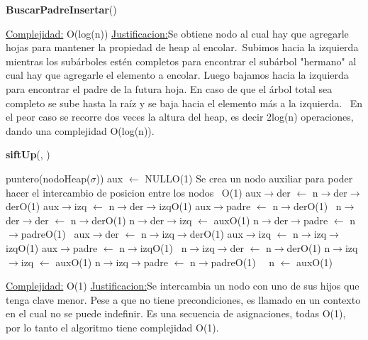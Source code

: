 \begin{Representacion}
\begin{Algoritmos}
\begin{algorithm}[H]{\textbf{BuscarPadreInsertar}()}
\begin{algorithmic}[1]
		\medskip
		\Statex \underline{Complejidad:} O(log(n))
			\Statex \underline{Justificacion:}Se obtiene nodo al cual hay que agregarle hojas para mantener la propiedad de heap al encolar.\,
			     Subimos hacia la izquierda mientras los subárboles estén completos para encontrar el subárbol "hermano" al cual hay que agregarle el elemento a encolar. Luego bajamos hacia la izquierda para encontrar el padre de la futura hoja. En caso de que el árbol total sea completo se sube hasta la raíz y se baja hacia el elemento más a la izquierda.
			\,   En el peor caso se recorre dos veces la altura del heap, es decir 2log(n) operaciones, dando una complejidad O(log(n)). 
	\end{algorithmic}
\end{algorithm}


\begin{algorithm}[H]{\textbf{siftUp}(, )}
	\begin{algorithmic}[1]
		
		\State puntero(nodoHeap($\sigma$)) aux $\leftarrow$ NULL\Comment O(1)
		\Comment Se crea un nodo auxiliar para poder hacer el intercambio de posicion entre los nodos
		\,
		\Comment O(1)
			\State aux$\rightarrow$der $\leftarrow$ n$\rightarrow$der$\rightarrow$der\Comment O(1)
			\State aux$\rightarrow$izq $\leftarrow$ n$\rightarrow$der$\rightarrow$izq\Comment O(1)
			\State aux$\rightarrow$padre $\leftarrow$ n$\rightarrow$der\Comment O(1)
			\,
			\State n$\rightarrow$der$\rightarrow$der $\leftarrow$ n$\rightarrow$der\Comment O(1)
			\State n$\rightarrow$der$\rightarrow$izq $\leftarrow$ aux\Comment O(1)
			\State n$\rightarrow$der$\rightarrow$padre $\leftarrow$ n$\rightarrow$padre\Comment O(1)
			\,
		\Else
			\State aux$\rightarrow$der $\leftarrow$ n$\rightarrow$izq$\rightarrow$der\Comment O(1)
			\State aux$\rightarrow$izq $\leftarrow$ n$\rightarrow$izq$\rightarrow$izq\Comment O(1)
			\State aux$\rightarrow$padre $\leftarrow$ n$\rightarrow$izq\Comment O(1)
			\,
			\State n$\rightarrow$izq$\rightarrow$der $\leftarrow$ n$\rightarrow$der\Comment O(1)
			\State n$\rightarrow$izq$\rightarrow$izq $\leftarrow$ aux\Comment O(1)
			\State n$\rightarrow$izq$\rightarrow$padre $\leftarrow$ n$\rightarrow$padre\Comment O(1)
			\,		
		\EndIf
		\,
		\State n $\leftarrow$ aux\Comment O(1)
		
		\medskip
		\Statex \underline{Complejidad:} O(1)
			\Statex \underline{Justificacion:}Se intercambia un nodo con uno de sus hijos que tenga clave menor. Pese a que no tiene precondiciones, es llamado en un contexto en el cual no se puede indefinir. Es una secuencia de asignaciones, todas O(1), por lo tanto el algoritmo tiene complejidad O(1).
	\end{algorithmic}
\end{algorithm}




\end{Algoritmos}
\end{Representacion}
